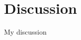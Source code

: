 \documentclass[../main.tex]{article}
\begin{document}
\section{Discussion}

My discussion
\end{document}
